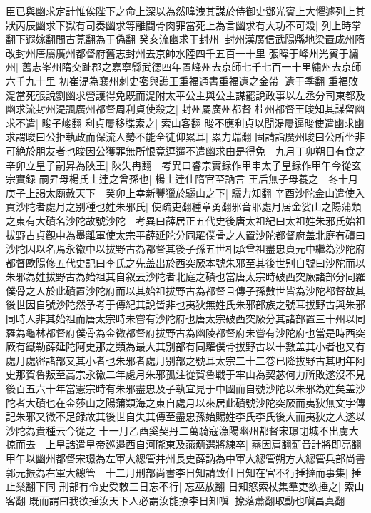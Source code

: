 臣已與幽求定計惟俟陛下之命上深以為然暐洩其謀於侍御史鄧光賓上大懼遽列上其狀丙辰幽求下獄有司奏幽求等離間骨肉罪當死上為言幽求有大功不可殺|{
	列上時掌翻下遐嫁翻間古莧翻為于偽翻}
癸亥流幽求于封州|{
	封州漢廣信武陽縣地梁置成州隋改封州唐屬廣州都督府舊志封州去京師水陸四千五百一十里}
張暐于峰州光賓于繡州|{
	舊志峯州隋交趾郡之嘉寧縣武德四年置峰州去京師七千七百一十里繡州去京師六千九十里}
初崔湜為襄州刺史密與譙王重福通書重福遺之金帶|{
	遺于季翻}
重福敗湜當死張說劉幽求營護得免既而湜附太平公主與公主謀罷說政事以左丞分司東都及幽求流封州湜諷廣州都督周利貞使殺之|{
	封州屬廣州都督}
桂州都督王晙知其謀留幽求不遣|{
	晙子峻翻}
利貞屢移牒索之|{
	索山客翻}
晙不應利貞以聞湜屢逼晙使遣幽求幽求謂晙曰公拒執政而保流人勢不能全徒仰累耳|{
	累力瑞翻}
固請詣廣州晙曰公所坐非可絶於朋友者也晙因公獲罪無所恨竟逗遛不遣幽求由是得免　九月丁卯朔日有食之　辛卯立皇子嗣昇為陜王|{
	陜失冉翻　考異曰睿宗實録作甲申太子皇録作甲午今從玄宗實録}
嗣昇母楊氏士逹之曾孫也|{
	楊士逹仕隋官至訥言}
王后無子母養之　冬十月庚子上謁太廟赦天下　癸卯上幸新豐獵於驪山之下|{
	驪力知翻}
辛酉沙陀金山遣使入貢沙陀者處月之别種也姓朱邪氏|{
	使疏吏翻種章勇翻邪音耶處月居金娑山之陽蒲類之東有大磧名沙陀故號沙陀　考異曰薛居正五代史後唐太祖紀曰太祖姓朱邪氏始祖拔野古貞觀中為墨離軍使太宗平薛延陀分同羅僕骨之人置沙陀都督府盖北庭有磧曰沙陀因以名焉永徽中以拔野古為都督其後子孫五世相承曾祖盡忠貞元中繼為沙陀府都督歐陽修五代史記曰李氏之先盖出於西突厥本號朱邪至其後世别自號曰沙陀而以朱邪為姓拔野古為始祖其自叙云沙陀者北庭之磧也當唐太宗時破西突厥諸部分同羅僕骨之人於此磧置沙陀府而以其始祖拔野古為都督且傳子孫數世皆為沙陀都督故其後世因自號沙陀然予考于傳紀其說皆非也夷狄無姓氏朱邪部族之號耳拔野古與朱邪同時人非其始祖而唐太宗時未嘗有沙陀府也唐太宗破西突厥分其諸部置三十州以同羅為龜林都督府僕骨為金微都督府拔野古為幽陵都督府未嘗有沙陀府也當是時西突厥有鐵勒薛延陀阿史那之類為最大其别部有同羅僕骨拔野古以十數盖其小者也又有處月處密諸部又其小者也朱邪者處月别部之號耳太宗二十二卷已降拔野古其明年阿史那賀魯叛至高宗永徽二年處月朱邪孤注從賀魯戰于牢山為契苾何力所敗遂沒不見後百五六十年當憲宗時有朱邪盡忠及子執宜見于中國而自號沙陀以朱邪為姓矣盖沙陀者大磧也在金莎山之陽蒲類海之東自處月以來居此磧號沙陀突厥而夷狄無文字傳記朱邪又微不足録故其後世自失其傳至盡忠孫始賜姓李氏李氏後大而夷狄之人遂以沙陀為貴種云今從之}
十一月乙酉奚契丹二萬騎寇漁陽幽州都督宋璟閉城不出虜大掠而去　上皇誥遣皇帝廵邉西自河隴東及燕薊選將練卒|{
	燕因肩翻薊音計將即亮翻}
甲午以幽州都督宋璟為左軍大總管并州長史薛訥為中軍大總管朔方大總管兵部尚書郭元振為右軍大總管　十二月刑部尚書李日知請致仕日知在官不行捶撻而事集|{
	捶止橤翻下同}
刑部有令史受敇三日忘不行|{
	忘巫放翻}
日知怒索杖集羣吏欲捶之|{
	索山客翻}
既而謂曰我欲捶汝天下人必謂汝能撩李日知嗔|{
	撩落蕭翻取動也嗔昌真翻}
